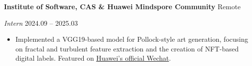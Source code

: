 \documentclass[11pt]{article}
\begin{document}
	\vspace{10pt}
	
	\textbf{Institute of Software, CAS \& Huawei Mindspore Community} \hfill Remote
	
	\textit{Intern} \hfill 2024.09 – 2025.03
	\begin{itemize}[noitemsep, topsep=0pt, partopsep=0pt, parsep=0pt, leftmargin=*]
		\item Implemented a VGG19-based model for Pollock-style art generation, focusing on fractal and turbulent feature extraction and the creation of NFT-based digital labels. Featured on \href{https://mp.weixin.qq.com/s/_N5oLsa0etJTxEOKRTt_4w}{Huawei's official Wechat}.
	\end{itemize}
	
	\vspace{10pt}
	
	\vspace{12pt}
	
\end{document}
